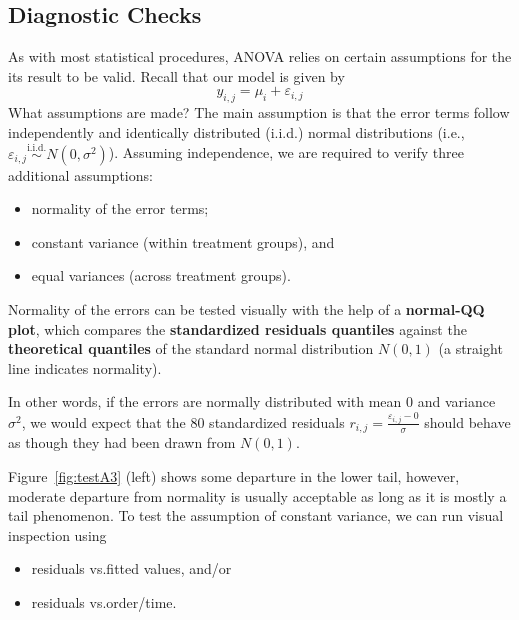 \subsection{Diagnostic Checks}
As with most statistical procedures, ANOVA relies on certain assumptions for the its result to be valid. Recall that our model is given by
\begin{equation*}
    y_{i,j}=\mu_{i}+\varepsilon_{i,j}
\end{equation*}
What assumptions are made? The main assumption is that the error terms follow independently and identically distributed ({i.i.d.}) normal distributions (i.e., $\varepsilon_{i,j}\stackrel{\text{i.i.d.}}{\sim}N(0,\sigma^{2})$). \newpage\noindent Assuming independence, we are required to verify three additional assumptions:
\begin{itemize}[noitemsep]
    \item normality of the error terms;
    \item constant variance (within treatment groups), and
    \item equal variances (across treatment groups).
\end{itemize}
Normality of the errors can be tested visually with the help of a \textbf{normal-QQ plot}, which compares the \textbf{standardized residuals quantiles} against the \textbf{theoretical quantiles} of the standard normal distribution $N(0,1)$ (a straight line indicates normality).\par In other words, if the errors are normally distributed with mean $0$ and variance $\sigma^2$, we would expect that the $80$ standardized residuals $r_{i,j}=\frac{\varepsilon_{i,j}-0}{\sigma}$ should behave as though they had been drawn from $N(0,1)$.\par  Figure~\ref{fig:testA3} (left) shows some departure in the lower tail, however, moderate departure from normality is usually acceptable as long as it is mostly a tail phenomenon.
\newl To test the assumption of constant variance, we can run visual inspection using  \begin{itemize} [noitemsep]
\item residuals vs.\@ fitted values, and/or 
\item residuals vs.\@ order/time. 
\end{itemize}
